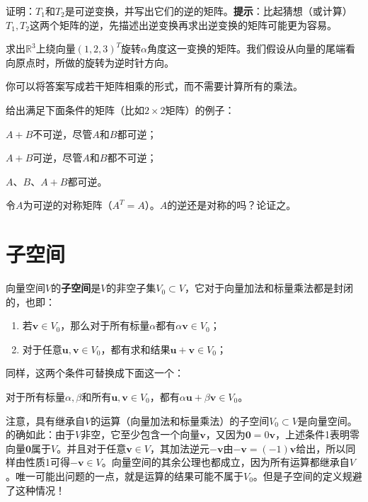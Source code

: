 \begin{problemset}
    证明：$T_1$和$T_2$是可逆变换，并写出它们的逆的矩阵。{\bf 提示}：比起猜想（或计算）$T_1,T_2$这两个矩阵的逆，先描述出逆变换再求出逆变换的矩阵可能更为容易。
    \item 求出$\mathbb{R}^3$上绕向量$(1,2,3)^T$旋转$\alpha$角度这一变换的矩阵。我们假设从向量的尾端看向原点时，所做的旋转为逆时针方向。
    
    你可以将答案写成若干矩阵相乘的形式，而不需要计算所有的乘法。
    \item 给出满足下面条件的矩阵（比如$2\times 2$矩阵）的例子：
    \begin{probenumerate}
        \item $A+B$不可逆，尽管$A$和$B$都可逆；
        \item $A+B$可逆，尽管$A$和$B$都不可逆；
        \item $A$、$B$、$A+B$都可逆。
    \end{probenumerate}
    \item 令$A$为可逆的对称矩阵（$A^T=A$）。$A$的逆还是对称的吗？论证之。
\end{problemset}

\section{子空间}\label{sec:subspace}

向量空间$V$的{\bf 子空间}是$V$的非空子集$V_0\subset V$，它对于向量加法和标量乘法都是封闭的，也即：
\begin{enumerate}
    \item 若$\mathbf{v}\in V_0$，那么对于所有标量$\alpha$都有$\alpha \mathbf{v}\in V_0$；
    \item 对于任意$\mathbf{u},\mathbf{v}\in V_0$，都有求和结果$\mathbf{u}+\mathbf{v}\in V_0$；
\end{enumerate}

同样，这两个条件可替换成下面这一个：
\begin{center}
    对于所有标量$\alpha,\beta$和所有$\mathbf{u},\mathbf{v}\in V_0$，都有$\alpha\mathbf{u}+\beta\mathbf{v}\in V_0$。
\end{center}

注意，具有继承自$V$的运算（向量加法和标量乘法）的子空间$V_0\subset V$是向量空间。的确如此：由于$V$非空，它至少包含一个向量$\mathbf{v}$，又因为$\mathbf{0}=0\mathbf{v}$，上述条件1表明零向量$\mathbf{0}$属于$V$。并且对于任意$\mathbf{v}\in V$，其加法逆元$-\mathbf{v}$由$-\mathbf{v}=(-1)\mathbf{v}$给出，所以同样由性质1可得$-\mathbf{v}\in V$。向量空间的其余公理也都成立，因为所有运算都继承自$V$。唯一可能出问题的一点，就是运算的结果可能不属于$V_0$。但是子空间的定义规避了这种情况！

